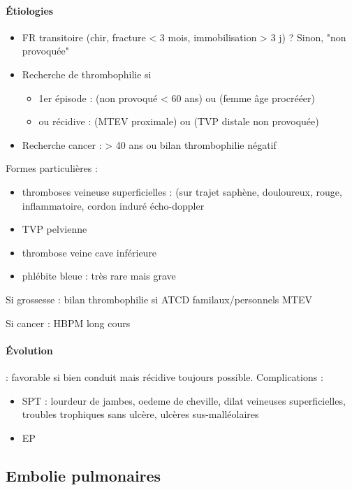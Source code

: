 \documentclass{article}
\begin{document}

\paragraph{Étiologies}
\begin{itemize}
  \item FR transitoire (chir, fracture < 3 mois, immobilisation > 3 j) ? Sinon, "non
provoquée"
\item Recherche de thrombophilie si
  \begin{itemize}
  \item 1er épisode :  (non provoqué < 60 ans) ou (femme âge procrééer)
  \item ou récidive : (MTEV proximale) ou (TVP distale non provoquée)
  \end{itemize}
\item Recherche cancer : > 40 ans ou bilan thrombophilie négatif
\end{itemize}

Formes particulières :
\begin{itemize}
  \item thromboses veineuse superficielles : (sur trajet saphène, douloureux,
    rouge, inflammatoire, cordon induré \thus écho-doppler
  \item TVP pelvienne
  \item thrombose veine cave inférieure
  \item phlébite bleue : très rare mais grave
\end{itemize}

Si grossesse : bilan thrombophilie si ATCD familaux/personnels MTEV

Si cancer : HBPM long cours

\paragraph{Évolution} : favorable si bien conduit mais récidive toujours
possible. Complications : 
\begin{itemize}
  \item SPT : lourdeur de jambes, oedeme de cheville, dilat veineuses
    superficielles, troubles trophiques sans ulcère, ulcères sus-malléolaires
  \item EP
\end{itemize}

\subsection{Embolie pulmonaires}
\end{document}
